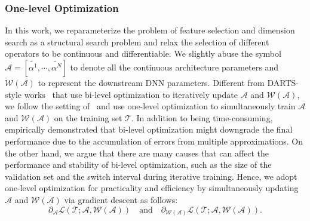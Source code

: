 \documentclass[10pt,journal,compsoc]{IEEEtran}
\begin{document}
\subsubsection{One-level Optimization}
In this work, we reparameterize the problem of feature selection and dimension search as a structural search problem and relax the selection of different operators to be continuous and differentiable.
We slightly abuse the symbol
$\mathcal{A}=[\widetilde{\alpha^1}, \cdots, \widetilde{\alpha^N}]$ to denote all the continuous architecture parameters and $\mathcal{W}(\mathcal{A})$ to represent the downstream DNN parameters.
Different from DARTS-style works~\cite{zhao2020memory,cheng2020differentiable, liu2018darts} that use bi-level optimization to iteratively update $\mathcal{A}$ and $\mathcal{W}(\mathcal{A})$, we follow the setting of~\cite{liu2020autofis} and use one-level optimization to simultaneously train $\mathcal{A}$ and $\mathcal{W}(\mathcal{A})$ on the training set $\mathcal{T}$. In addition to being time-consuming,~\cite{liu2020autofis} empirically demonstrated that bi-level optimization might downgrade the final performance due to the accumulation of errors from multiple approximations. On the other hand, we argue that there are many causes that can affect the performance and stability of bi-level optimization, such as the size of the validation set and the switch interval during iterative training. Hence, we adopt one-level optimization for practicality and efficiency by simultaneously updating $\mathcal{A}$ and $\mathcal{W}(\mathcal{A})$ via gradient descent as follows:
\begin{equation}
  \partial_\mathcal{A}{\mathcal{L}\left(\mathcal{T}; \mathcal{A}, \mathcal{W}\left(\mathcal{A}\right)\right)}  \quad \text{and} \quad \partial_{\mathcal{W}\left(\mathcal{A}\right)}{\mathcal{L}\left(\mathcal{T}; \mathcal{A}, \mathcal{W}\left(\mathcal{A}\right)\right)}.
\end{equation}
\end{document}
